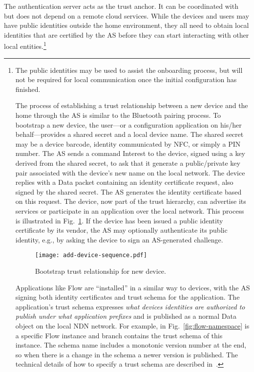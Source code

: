 The authentication server acts as the trust anchor. It can be coordinated with but does not depend on a remote cloud services.
While the devices and users may have public identities outside the home environment, they all need to obtain local identities that are certified by the AS before they can start interacting with other local entities.\footnote{The public identities may be used to assist the onboarding process, but will not be required for local communication once the initial configuration has finished.

The process of establishing a trust relationship between a new device and the home through the AS is similar to the Bluetooth pairing process.
To bootstrap a new device, the user---or a configuration application on his/her behalf---provides a shared secret and a local device name.  The shared secret may be a device barcode, identity communicated by NFC, or simply a PIN number. 
The AS sends a command Interest to the device, signed using a key derived from the shared secret, to ask that it generate a public/private key pair associated with the device's new name on the local network.  The device replies with a Data packet containing an identity certificate request, also signed by the shared secret.
The AS generates the identity certificate based on this request.  The device, now part of the trust hierarchy, can advertise its services or participate in an application over the local network.
This process is illustrated in Fig.~\ref{fig:flow-bootstrap}.
If the device has been issued a public identity certificate by its vendor, the AS may optionally authenticate its public identity, e.g., by asking the device to sign an AS-generated challenge.

\begin{figure}[!t]
\centering
\texttt{[image: add-device-sequence.pdf]}
\caption{Bootstrap trust relationship for new device.}
\label{fig:flow-bootstrap}
\end{figure}

Applications like Flow are ``installed'' in a similar way to devices, with the AS signing both identity certificates and trust schema for the application.  The application's trust schema expresses \textit{what devices identities are authorized to publish under what application prefixes} and is published as a normal Data object on the local NDN network. 
For example, in Fig.~\ref{fig:flow-namespace}  is a specific Flow instance and  branch contains the trust schema of this instance.
The schema name includes a monotonic version number at the end, so when there is a change in the schema a newer version is published.
The technical details of how to specify a trust schema are described in~\cite{trust-schema}.

}
